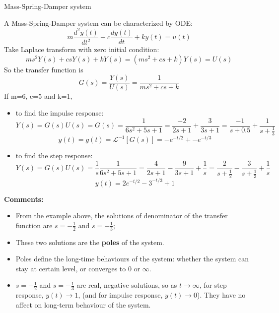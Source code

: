 \begin{ex}{Mass-Spring-Damper system}
    \begin{figure}[H] 
        \centering
        
    \end{figure}
    A Mass-Spring-Damper system can be characterized by ODE:
    \[ m\frac{d^{2}y(t)}{dt^{2}}+c\frac{dy(t)}{dt}+ky(t)=u(t) \]
    Take Laplace transform with zero initial condition:
    \[ ms^{2}Y(s)+csY(s)+kY(s)=(ms^{2}+cs+k)Y(s)=U(s) \]
    So the transfer function is 
    \[ G(s)=\frac{Y(s)}{U(s)}= \frac{1}{ms^{2}+cs+k} \]
    If m=6, c=5 and k=1, 
    \begin{itemize}
    \item to find the impulse response:
    \[ 
    Y(s) = G(s)U(s) = G(s) 
    = \frac{1}{6s^{2}+5s+1} 
    = \frac{-2}{2s+1}+\frac{3}{3s+1}= \frac{-1}{s+0.5}+\frac{1}{s+\frac{1}{3}} 
    \]
    \[ 
    y(t) = g(t) 
    = \mathcal{L}^{-1} [G(s)] 
    = -e^{-t/2}+-e^{-t/3} 
    \]
    
    \item to find the step response:
    \[
    Y(s) = G(s)U(s) = \frac{1}{s}\frac{1}{6s^{2}+5s+1} 
    = \frac{4}{2s+1}-\frac{9}{3s+1} +\frac{1}{s} 
    = \frac{2}{s+\frac{1}{2}}-\frac{3}{s+\frac{1}{3}} +\frac{1}{s} \]
    \[ y(t) = 2e^{-t/2}-3^{-t/3} +1 \]
    \end{itemize}
    
    \textbf{Comments:}
    \begin{itemize}
     \item From the example above, the solutions of denominator of the transfer function are $s = -\frac{1}{2}$ and $s = -\frac{1}{3}$;
     
     \item These two solutions are the \textbf{poles} of the system. 
     \item Poles define the long-time behaviours of the system: whether the system can stay at certain level, or converges to 0 or $\infty$.
     
     \item $s = -\frac{1}{2}$ and $s = -\frac{1}{3}$ are real, negative solutions, so as $t\to \infty$, 
     for step response,  $y(t) \to 1$, (and for impulse response, $y(t) \to 0$). They have no affect on long-term behaviour of the system.
    \end{itemize}
\end{ex}

